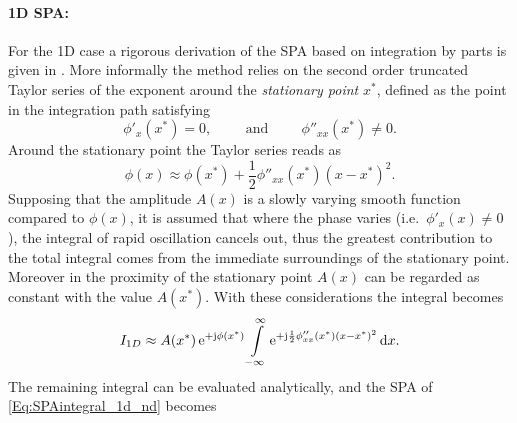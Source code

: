 \paragraph{1D SPA:} 
For the 1D case a rigorous derivation of the SPA based on integration by parts is given in \cite{Bleistein1984, Blenstein1975, Williams1999}.
More informally the method relies on the second order truncated Taylor series of the exponent around the \emph{stationary point} $x^*$, defined as the point in the integration path satisfying 
\begin{equation}
\phi'_x(x^*) = 0, \hspace{1cm} \text{and} \hspace{1cm} \phi''_{xx}(x^*) \neq 0.
\end{equation}
Around the stationary point the Taylor series reads as
\begin{equation}
\phi(x) \approx \phi(x^*) + \frac{1}{2}\phi''_{xx}(x^*)(x-x^*)^2.
\end{equation}
%
Supposing that the amplitude $A(x)$ is a slowly varying smooth function compared to $\phi(x)$, it is assumed that where the phase varies (i.e.\ $\phi'_x(x) \neq 0$), the integral of rapid oscillation cancels out, thus the greatest contribution to the total integral comes from the immediate surroundings of the stationary point.
Moreover in the proximity of the stationary point $A(x)$ can be regarded as constant with the value $A(x^*)$.
%
With these considerations the integral becomes
\begin{align}
I_{1D} \approx A(x^*)\,\mathrm{e}^{+\mathrm{j}\phi(x^*)} 
\int\limits_{-\infty}^{\infty} \mathrm{e}^{+\mathrm{j} \frac{1}{2}\phi''_{xx}(x^*)(x-x^*)^2} \, \mathrm{d} x.
\end{align}
The remaining integral can be evaluated analytically, and the SPA of \eqref{Eq:SPAintegral_1d_nd} becomes \cite[Ch.\ 2.8]{Blenstein1975}

